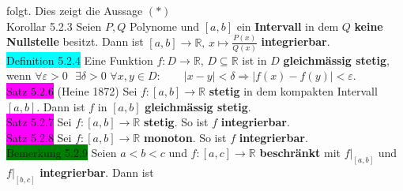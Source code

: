 \documentclass[landscape, 10pt]{article}
\newcommand{\R}{\mathbb{R}}
\begin{document}
\begin{multicols}{3}
                     folgt. Dies zeigt die Aussage $(*)$ \\
              \colorbox{BurntOrange}{Korollar 5.2.3} 
                     Seien \textcolor{NavyBlue}{$P,Q$} Polynome und 
                     \textcolor{NavyBlue}{$[a,b]$}
                     ein \textbf{Intervall} in dem \textcolor{NavyBlue}{$Q$} 
                     \textbf{keine Nullstelle} besitzt. Dann ist 
                     \textcolor{NavyBlue}{
                     $[a,b]\longrightarrow\R,\,x\mapsto\frac{P(x)}{Q(x)}$}
                     \textbf{integrierbar}.\\
              \colorbox{cyan}{Definition 5.2.4} 
                     Eine Funktion 
                     \textcolor{NavyBlue}{$f:D\longrightarrow\R,\,D\subseteq\R$}
                     ist in \textcolor{NavyBlue}{$D$} 
                     \textbf{gleichmässig stetig}, wenn 
                     \textcolor{NavyBlue}{
                     $\forall\varepsilon>0\,\enspace\exists\delta>0$\quad
                     $\forall x,y\in D:\qquad|x-y|<\delta
                     \Longrightarrow|f(x)-f(y)|<\varepsilon$}.\\
              \colorbox{magenta}{Satz 5.2.6} 
                     (Heine 1872) Sei 
                     \textcolor{NavyBlue}{$f:[a,b]\longrightarrow\R$}
                     \textbf{stetig} in dem kompakten Intervall 
                     \textcolor{NavyBlue}{$[a,b]$}. 
                     Dann ist \textcolor{NavyBlue}{$f$} in 
                     \textcolor{NavyBlue}{$[a,b]$}
                     \textbf{gleichmässig stetig}.\\
              \colorbox{magenta}{Satz 5.2.7} 
                     Sei \textcolor{NavyBlue}{$f:[a,b]\longrightarrow\R$} 
                     \textbf{stetig}. So ist \textcolor{NavyBlue}{$f$} 
                     \textbf{integrierbar}.\\
              \colorbox{magenta}{Satz 5.2.8} 
                     Sei \textcolor{NavyBlue}{$f:[a,b]\longrightarrow\R$} 
                     \textbf{monoton}. So ist \textcolor{NavyBlue}{$f$} 
                     \textbf{integrierbar}.\\
              \colorbox{green}{Bemerkung 5.2.9} 
                     Seien \textcolor{NavyBlue}{$a<b<c$} und 
                     \textcolor{NavyBlue}{$f:[a,c]\longrightarrow\R$} 
                     \textbf{beschränkt} mit 
                     \textcolor{NavyBlue}{$f|_{[a,b]}$} und 
                     \textcolor{NavyBlue}{$f|_{[b,c]}$} 
                     \textbf{integrierbar}. Dann ist 

\end{multicols}
\end{document}
